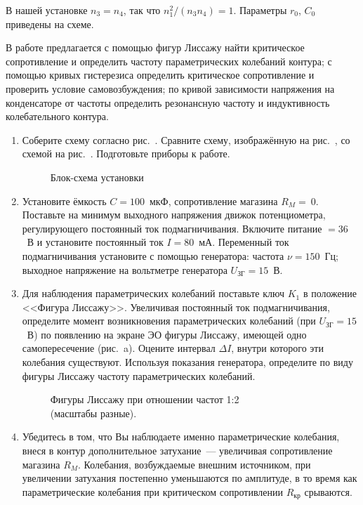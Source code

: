 В нашей установке $n_3 = n_4$, так что $n_1^2/ (n_3n_4) = 1$. Параметры $r_0$, $C_0$ приведены на схеме.

\begin{lab:task}
В работе предлагается с помощью фигур Лиссажу найти критическое сопротивление и определить частоту параметрических колебаний контура; с помощью кривых гистерезиса определить критическое сопротивление и проверить условие самовозбуждения; по кривой зависимости напряжения на конденсаторе от частоты определить резонансную частоту и индуктивность колебательного контура.
\begin{enumerate}
\item
Соберите схему согласно рис.~. Сравните схему, изображённую на рис.~, со схемой на рис.~. Подготовьте приборы к работе.
\begin{figure}[h!]
	\caption{Блок-схема установки}
\end{figure}

\item
Установите ёмкость $C = 100$~мкФ, сопротивление магазина $R_M =~0.$ Поставьте на минимум выходного напряжения движок потенциометра, регулирующего постоянный ток подмагничивания. Включите питание $= 36$~В и установите постоянный ток $I =80$~мА. Переменный ток подмагничивания установите с помощью генератора: частота $\nu = 150$~Гц; выходное напряжение на вольтметре генератора $U_\text{ЗГ} = 15$~В.

\item
Для наблюдения параметрических колебаний поставьте ключ $K_1$ в положение <<Фигура Лиссажу>>. Увеличивая постоянный ток подмагничивания, определите момент возникновения параметрических колебаний (при $U_\text{ЗГ} = 15$~В) по появлению на экране ЭО фигуры Лиссажу, имеющей одно самопересечение (рис.~a). Оцените интервал $\Delta I$, внутри которого эти колебания существуют. Используя показания генератора, определите по виду фигуры Лиссажу частоту параметрических колебаний.
\begin{figure}[h!]
	\caption{Фигуры Лиссажу при отношении частот 1:2 \\(масштабы разные).}
\end{figure}

\item
Убедитесь в том, что Вы наблюдаете именно параметрические колебания, внеся в контур дополнительное затухание~--- увеличивая сопротивление магазина $R_M$. Колебания, возбуждаемые внешним источником, при увеличении затухания постепенно уменьшаются по амплитуде, в то время как параметрические колебания при критическом сопротивлении $R_\text{кр}$ срываются.


\end{enumerate}
\end{lab:task}
